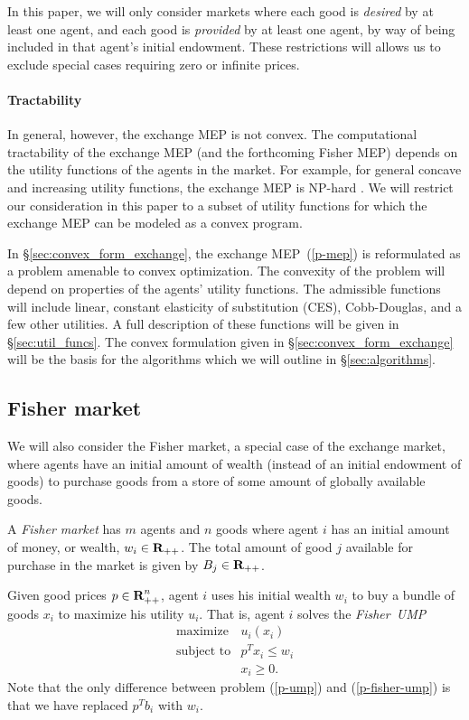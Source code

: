 \documentclass[12pt]{article}
\begin{document}
In this paper, we will only consider markets where each good is \emph{desired} by at least one agent, and each good is \emph{provided} by at least one agent, by way of being included in that agent's initial endowment.
These restrictions will allows us to exclude special cases requiring zero or infinite
prices.


\paragraph{Tractability}
In general, however, the exchange MEP is not convex.
The computational tractability of the exchange MEP
(and the forthcoming Fisher MEP) depends on the utility functions of
the agents in the market.
For example, for general concave and increasing utility functions,
the exchange MEP is NP-hard \cite{codenotti2006leontief}.
We will restrict our consideration in this paper to a subset of utility
functions for which the exchange MEP can be modeled as a convex program.

In \S\ref{sec:convex_form_exchange}, the exchange MEP~(\ref{p-mep})
is reformulated as a problem amenable to convex optimization.
The convexity of the problem will depend on properties of the
agents' utility functions.
The admissible functions will include linear, constant elasticity
of substitution (CES), Cobb-Douglas, and a few other utilities.
A full description of these functions will be given in \S\ref{sec:util_funcs}.
The convex formulation given in \S\ref{sec:convex_form_exchange} will
be the basis for the algorithms which
we will outline in \S\ref{sec:algorithms}.


\subsection{Fisher market}
We will also consider the Fisher market, a special case of the exchange market, where agents have an initial amount of wealth (instead of an initial endowment of goods)
to purchase goods from a store of some amount of globally available goods.


A \emph{Fisher market} has $m$ agents and $n$ goods where
agent $i$ has an initial amount of money, or wealth, $w_i \in {\mbox{\bf R}}_{++}$.
The total amount of good $j$ available for purchase in the market is given by
$B_j \in {\mbox{\bf R}}_{++}$.

Given good prices $p \in {\mbox{\bf R}}^n_{++}$, agent $i$ uses his initial
wealth $w_i$ to buy a bundle of goods $x_i$ to maximize his utility $u_i$.
That is, agent $i$ solves the \emph{Fisher~UMP}
\begin{equation}
\label{p-fisher-ump}
\begin{array}{ll}
\mbox{maximize} & u_i(x_i) \\
\mbox{subject to} & p^T x_i \leq w_i \\
& x_i \geq 0.
\end{array}
\end{equation}
Note that the only difference between problem (\ref{p-ump}) and (\ref{p-fisher-ump}) is that we have replaced $p^T b_i$ with $w_i$.
\end{document}
